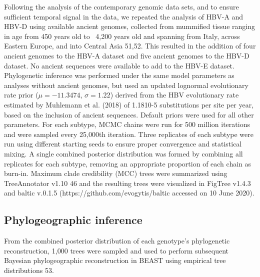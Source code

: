 Following the analysis of the contemporary genomic data sets, and to ensure sufficient temporal signal in the data, we repeated the analysis of HBV-A and HBV-D using available ancient genomes, collected from mummified tissue ranging in age from 450 years old to ~4,200 years old and spanning from Italy, across Eastern Europe, and into Central Asia 51,52. This resulted in the addition of four ancient genomes to the HBV-A dataset and five ancient genomes to the HBV-D dataset. No ancient sequences were available to add to the HBV-E dataset. Phylogenetic inference was performed under the same model parameters as analyses without ancient genomes, but used an updated lognormal evolutionary rate prior ($\mu=-11.3474$, $\sigma=1.22$) derived from the HBV evolutionary rate estimated by Muhlemann et al. (2018) of 1.1810-5 substitutions per site per year, based on the inclusion of ancient sequences. Default priors were used for all other parameters. For each subtype, MCMC chains were run for 500 million iterations and were sampled every 25,000th iteration. Three replicates of each subtype were run using different starting seeds to ensure proper convergence and statistical mixing. A single combined posterior distribution was formed by combining all replicates for each subtype, removing an appropriate proportion of each chain as burn-in. Maximum clade credibility (MCC) trees were summarized using TreeAnnotator v1.10 46 and the resulting trees were visualized in FigTree v1.4.3 and baltic v.0.1.5 (https://github.com/evogytis/baltic accessed on 10 June 2020).

\subsection{Phylogeographic inference}
From the combined posterior distribution of each genotype's phylogenetic reconstruction, 1,000 trees were sampled and used to perform subsequent Bayesian phylogeographic reconstruction in BEAST using empirical tree distributions 53.\\


